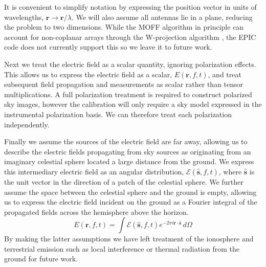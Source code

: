 \documentclass[a4paper,fleqn,usenatbib]{mnras}
\begin{document}
It is convenient to simplify notation by expressing the position vector in units of wavelengths, 
$\mathbf{r}\rightarrow \mathbf{r}/\lambda$. We will also assume all antennas lie in a plane, 
reducing the problem to two dimensions. While the MOFF algorithm in principle can account for 
non-coplanar arrays through the W-projection algorithm \citep{cor08}, the EPIC code does not 
currently support this so we leave it to future work.

Next we treat the electric field as a scalar quantity, ignoring polarization effects. This allows us 
to express the electric field as a scalar, $E(\mathbf{r},f,t)$, and treat subsequent field 
propagation and measurements as scalar rather than tensor multiplications. A full polarization 
treatment is required to construct polarized sky images, however the calibration will only 
require a sky model expressed in the instrumental polarization basis. We can therefore treat 
each polarization independently.

Finally we assume the sources of the electric field are far away, allowing us to describe the 
electric fields propagating from sky sources as originating from an imaginary celestial sphere 
located a large distance from the ground. We express this intermediary electric field as an 
angular distribution, $\mathcal{E}(\hat{\mathbf{s}},f,t)$, where $\hat{\mathbf{s}}$ is the unit 
vector in the direction of a patch of the celestial sphere. We further assume the space between 
the celestial sphere and the ground is empty, allowing us to express the electric field incident 
on the ground as a Fourier integral of the propagated fields across the hemisphere above the horizon.
\begin{equation}\label{eq:sky_propagated}
E(\mathbf{r},f,t) = \int \mathcal{E}(\hat{\mathbf{s}},f,t) e^{-2\pi i \mathbf{r} \cdot \hat{\mathbf{s}}}\, d\Omega
\end{equation}  
By making the latter assumptions we have left treatment of the ionosphere and terrestrial 
emission such as local interference or thermal radiation from the ground for future work. 
\end{document}
